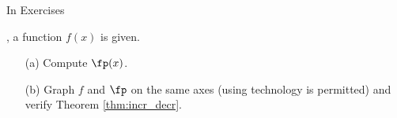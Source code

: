 {\noindent In Exercises}
{, a function $f(x)$ is given.
	\begin{enumerate}
	\item	[(a)] Compute $\fp(x)$.
	\item	[(b)] Graph $f$ and $\fp$ on the same axes (using technology is permitted) and verify Theorem \ref{thm:incr_decr}.
	\end{enumerate}
}
